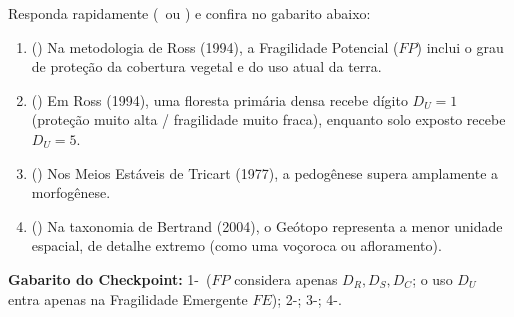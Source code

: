 \begin{boxTeste}
Responda rapidamente (\V\ ou \F) e confira no gabarito abaixo:
\begin{enumerate}[leftmargin=1.6em, itemsep=2.5pt]
  \item (\quad) Na metodologia de Ross (1994), a Fragilidade Potencial ($FP$) inclui o grau de proteção da cobertura vegetal e do uso atual da terra.
  \item (\quad) Em Ross (1994), uma floresta primária densa recebe dígito $D_U = 1$ (proteção muito alta / fragilidade muito fraca), enquanto solo exposto recebe $D_U = 5$.
  \item (\quad) Nos Meios Estáveis de Tricart (1977), a pedogênese supera amplamente a morfogênese.
  \item (\quad) Na taxonomia de Bertrand (2004), o Geótopo representa a menor unidade espacial, de detalhe extremo (como uma voçoroca ou afloramento).
\end{enumerate}
\vspace{4pt}
{\footnotesize\textbf{Gabarito do Checkpoint:} 1-\F\ ($FP$ considera apenas $D_R, D_S, D_C$; o uso $D_U$ entra apenas na Fragilidade Emergente $FE$); 2-\V; 3-\V; 4-\V.}
\end{boxTeste}
